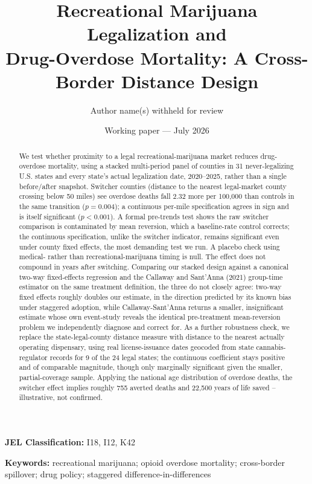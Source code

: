 \documentclass[12pt]{article}
\title{\bfseries Recreational Marijuana Legalization and\\
Drug-Overdose Mortality: A Cross-Border Distance Design}
\author{Author name(s) withheld for review}
\date{Working paper --- July 2026}
\begin{document}
\maketitle

\begin{abstract}
\noindent We test whether proximity to a legal recreational-marijuana
market reduces drug-overdose mortality, using a stacked multi-period
panel of counties in 31 never-legalizing U.S. states and every state's
actual legalization date, 2020--2025, rather than a single
before/after snapshot. Switcher counties (distance to the nearest
legal-market county crossing below 50 miles) see overdose deaths fall
2.32 more per 100,000 than controls in the same transition
($p=0.004$); a continuous per-mile specification agrees in sign and is
itself significant ($p<0.001$). A formal pre-trends test shows the raw
switcher comparison is contaminated by mean reversion, which a
baseline-rate control corrects; the continuous specification, unlike
the switcher indicator, remains significant even under county fixed
effects, the most demanding test we run. A placebo check using
medical- rather than recreational-marijuana timing is null. The effect
does not compound in years after switching. Comparing our stacked
design against a canonical two-way fixed-effects regression and the
Callaway and Sant'Anna (2021) group-time estimator on the same
treatment definition, the three do not closely agree: two-way fixed
effects roughly doubles our estimate, in the direction predicted by
its known bias under staggered adoption, while Callaway-Sant'Anna
returns a smaller, insignificant estimate whose own event-study
reveals the identical pre-treatment mean-reversion problem we
independently diagnose and correct for. As a further robustness
check, we replace the state-legal-county distance measure with
distance to the nearest actually operating dispensary, using real
license-issuance dates geocoded from state cannabis-regulator records
for 9 of the 24 legal states; the continuous coefficient stays
positive and of comparable magnitude, though only marginally
significant given the smaller, partial-coverage sample. Applying the
national age distribution of overdose deaths, the switcher effect
implies roughly 755 averted deaths and 22,500 years of life saved --
illustrative, not confirmed.
\end{abstract}

\noindent\textbf{JEL Classification:} I18, I12, K42

\noindent\textbf{Keywords:} recreational marijuana; opioid overdose
mortality; cross-border spillover; drug policy; staggered
difference-in-differences
\end{document}
